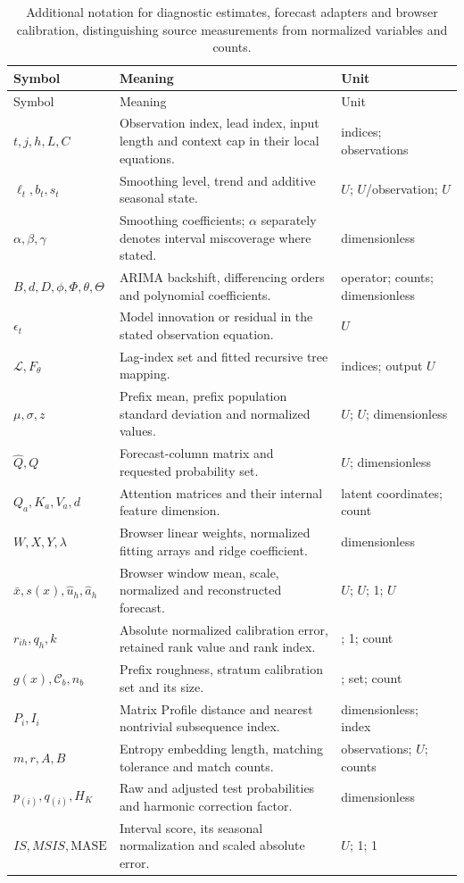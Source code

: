 
\begin{longtable}{>{\raggedright\arraybackslash}p{}>{\raggedright\arraybackslash}p{}>{\raggedright\arraybackslash}p{}}
\caption{Additional notation for diagnostic estimates, forecast adapters and browser calibration, distinguishing source measurements from normalized variables and counts.}\label{tab:report-symbols}\\
\toprule Symbol & Meaning & Unit\\\midrule\endfirsthead
\toprule Symbol & Meaning & Unit\\\midrule\endhead
$t,j,h,L,C$ & Observation index, lead index, input length and context cap in their local equations. & indices; observations\\
$\ell_t,b_t,s_t$ & Smoothing level, trend and additive seasonal state. & $U$; $U$/observation; $U$\\
$\alpha,\beta,\gamma$ & Smoothing coefficients; $\alpha$ separately denotes interval miscoverage where stated. & dimensionless\\
$B,d,D,\phi,\Phi,\theta,\Theta$ & ARIMA backshift, differencing orders and polynomial coefficients. & operator; counts; dimensionless\\
$\epsilon_t$ & Model innovation or residual in the stated observation equation. & $U$\\
$\mathcal L,F_\theta$ & Lag-index set and fitted recursive tree mapping. & indices; output $U$\\
$\mu,\sigma,z$ & Prefix mean, prefix population standard deviation and normalized values. & $U$; $U$; dimensionless\\
$\widehat Q,Q$ & Forecast-column matrix and requested probability set. & $U$; dimensionless\\
$Q_a,K_a,V_a,d$ & Attention matrices and their internal feature dimension. & latent coordinates; count\\
$W,X,Y,\lambda$ & Browser linear weights, normalized fitting arrays and ridge coefficient. & dimensionless\\
$\bar x,s(x),\widehat u_h,\widehat a_h$ & Browser window mean, scale, normalized and reconstructed forecast. & $U$; $U$; 1; $U$\\
$r_{ih},q_h,k$ & Absolute normalized calibration error, retained rank value and rank index. & 1; 1; count\\
$g(x),\mathcal C_b,n_b$ & Prefix roughness, stratum calibration set and its size. & 1; set; count\\
$P_i,I_i$ & Matrix Profile distance and nearest nontrivial subsequence index. & dimensionless; index\\
$m,r,A,B$ & Entropy embedding length, matching tolerance and match counts. & observations; $U$; counts\\
$p_{(i)},q_{(i)},H_K$ & Raw and adjusted test probabilities and harmonic correction factor. & dimensionless\\
$IS,MSIS,\mathrm{MASE}$ & Interval score, its seasonal normalization and scaled absolute error. & $U$; 1; 1\\
\bottomrule
\end{longtable}
